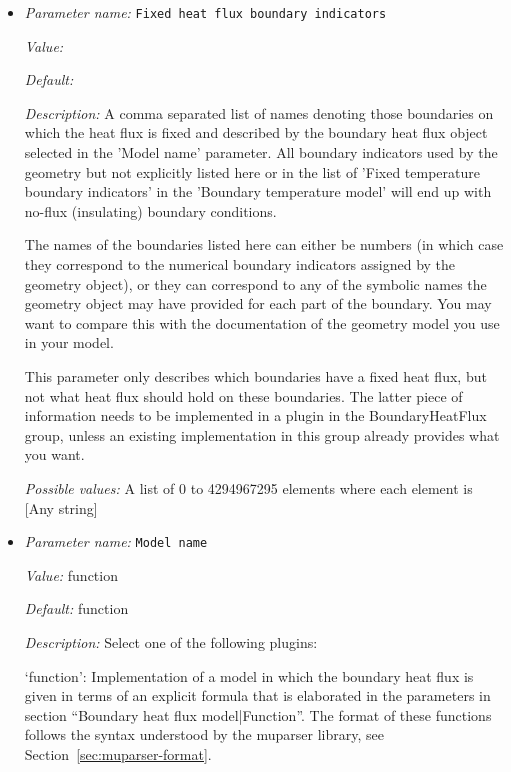 \begin{itemize}
\item {\it Parameter name:} {\tt Fixed heat flux boundary indicators}
\label{parameters:Boundary heat flux model/Fixed heat flux boundary indicators}
\label{parameters:Boundary_20heat_20flux_20model/Fixed_20heat_20flux_20boundary_20indicators}


{\it Value:} 


{\it Default:} 


{\it Description:} A comma separated list of names denoting those boundaries on which the heat flux is fixed and described by the boundary heat flux object selected in the 'Model name' parameter. All boundary indicators used by the geometry but not explicitly listed here or in the list of 'Fixed temperature boundary indicators' in the 'Boundary temperature model' will end up with no-flux (insulating) boundary conditions.

The names of the boundaries listed here can either be numbers (in which case they correspond to the numerical boundary indicators assigned by the geometry object), or they can correspond to any of the symbolic names the geometry object may have provided for each part of the boundary. You may want to compare this with the documentation of the geometry model you use in your model.

This parameter only describes which boundaries have a fixed heat flux, but not what heat flux should hold on these boundaries. The latter piece of information needs to be implemented in a plugin in the BoundaryHeatFlux group, unless an existing implementation in this group already provides what you want.


{\it Possible values:} A list of 0 to 4294967295 elements where each element is [Any string]
\item {\it Parameter name:} {\tt Model name}
\label{parameters:Boundary heat flux model/Model name}
\label{parameters:Boundary_20heat_20flux_20model/Model_20name}


{\it Value:} function


{\it Default:} function


{\it Description:} Select one of the following plugins:

`function': Implementation of a model in which the boundary heat flux is given in terms of an explicit formula that is elaborated in the parameters in section ``Boundary heat flux model|Function''. The format of these functions follows the syntax understood by the muparser library, see Section~\ref{sec:muparser-format}.


\end{itemize}
